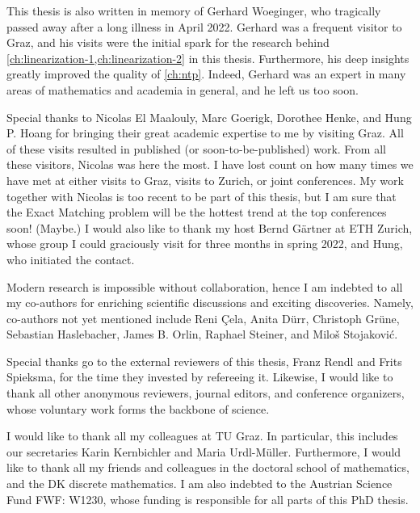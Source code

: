 \documentclass[twoside,openright,bibliography=totoc]{scrreprt}
\begin{document}
This thesis is also written in memory of Gerhard Woeginger, who tragically passed away after a long illness in April 2022. Gerhard was a frequent visitor to Graz, and his visits were the initial spark for the research behind \cref{ch:linearization-1,ch:linearization-2} in this thesis. Furthermore, his deep insights greatly improved the quality of \cref{ch:ntp}. Indeed, Gerhard was an expert in many areas of mathematics and academia in general, and he left us too soon.

Special thanks to Nicolas El Maalouly, Marc Goerigk, Dorothee Henke, and Hung P. Hoang for bringing their great academic expertise to me by visiting Graz. All of these visits resulted in published (or soon-to-be-published) work. From all these visitors, Nicolas was here the most. I have lost count on how many times we have met at either visits to Graz, visits to Zurich, or joint conferences. My work together with Nicolas is too recent to be part of this thesis, but I am sure that the Exact Matching problem will be the hottest trend at the top conferences soon! (Maybe.)
I would also like to thank my host Bernd Gärtner at ETH Zurich, whose group I could graciously visit for three months in spring 2022, and Hung, who initiated the contact.


Modern research is impossible without collaboration, hence I am indebted to all my co-authors for enriching scientific discussions and exciting discoveries. Namely, co-authors not yet mentioned include Reni \c{C}ela, Anita Dürr, Christoph Grüne, Sebastian Haslebacher, James B. Orlin, Raphael Steiner, and Milo\v{s} Stojakovi\'{c}.

Special thanks go to the external reviewers of this thesis, Franz Rendl and Frits Spieksma, for the time they invested by refereeing it. Likewise, I would like to thank all other anonymous reviewers, journal editors, and conference organizers, whose voluntary work forms the backbone of science.

I would like to thank all my colleagues at TU Graz. In particular, this includes our secretaries Karin Kernbichler and Maria Urdl-Müller. Furthermore, I would like to thank all my friends and colleagues in the doctoral school of mathematics, and the DK discrete mathematics. I am also indebted to the Austrian Science Fund FWF: W1230, whose funding is responsible for all parts of this PhD thesis.
\end{document}
